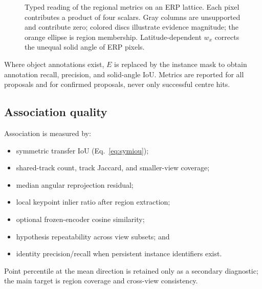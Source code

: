 \documentclass[a4paper,9pt]{extarticle}
\begin{document}
\begin{figure}[t]
\centering
{}
\caption{Typed reading of the regional metrics on an ERP lattice. Each pixel contributes a product of four scalars. Gray columns are unsupported and contribute zero; colored discs illustrate evidence magnitude; the orange ellipse is region membership. Latitude-dependent $w_x$ corrects the unequal solid angle of ERP pixels.}
\label{fig:metrictypes}
\end{figure}
Where object annotations exist, $E$ is replaced by the instance mask to obtain annotation recall, precision, and solid-angle IoU. Metrics are reported for all proposals and for confirmed proposals, never only successful centre hits.

\subsection{Association quality}

Association is measured by:
\begin{itemize}
 \item symmetric transfer IoU (Eq.~\ref{eq:symiou});
 \item shared-track count, track Jaccard, and smaller-view coverage;
 \item median angular reprojection residual;
 \item local keypoint inlier ratio after region extraction;
 \item optional frozen-encoder cosine similarity;
 \item hypothesis repeatability across view subsets; and
 \item identity precision/recall when persistent instance identifiers exist.
\end{itemize}
Point percentile at the mean direction is retained only as a secondary diagnostic; the main target is region coverage and cross-view consistency.
\end{document}
